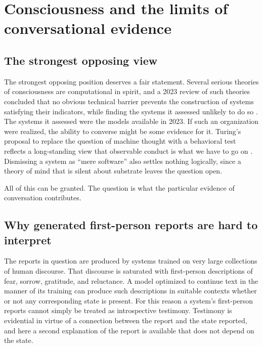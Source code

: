 \documentclass[11pt]{article}
\begin{document}
\section{Consciousness and the limits of conversational evidence}

\subsection{The strongest opposing view}

The strongest opposing position deserves a fair statement. Several serious theories of consciousness are computational in spirit, and a 2023 review of such theories concluded that no obvious technical barrier prevents the construction of systems satisfying their indicators, while finding the systems it assessed unlikely to do so \cite{butlin2023}. The systems it assessed were the models available in 2023. If such an organization were realized, the ability to converse might be some evidence for it. Turing's proposal to replace the question of machine thought with a behavioral test reflects a long-standing view that observable conduct is what we have to go on \cite{turing1950}. Dismissing a system as ``mere software'' also settles nothing logically, since a theory of mind that is silent about substrate leaves the question open.

All of this can be granted. The question is what the particular evidence of conversation contributes.

\subsection{Why generated first-person reports are hard to interpret}

The reports in question are produced by systems trained on very large collections of human discourse. That discourse is saturated with first-person descriptions of fear, sorrow, gratitude, and reluctance. A model optimized to continue text in the manner of its training can produce such descriptions in suitable contexts whether or not any corresponding state is present. For this reason a system's first-person reports cannot simply be treated as introspective testimony. Testimony is evidential in virtue of a connection between the report and the state reported, and here a second explanation of the report is available that does not depend on the state.
\end{document}
